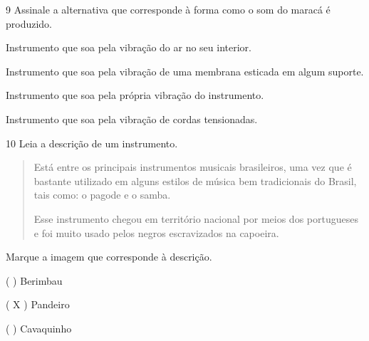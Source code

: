 
\num{9}  Assinale a alternativa que corresponde à forma como o som do maracá é produzido.

\begin{boxlist}
 Instrumento que soa pela vibração do ar no seu interior.

 Instrumento que soa pela vibração de uma membrana esticada em algum suporte.

 Instrumento que soa pela própria vibração do instrumento.

 Instrumento que soa pela vibração de cordas tensionadas.
\end{boxlist}


\num{10} Leia a descrição de um instrumento.

\begin{quote}
Está entre os principais instrumentos musicais brasileiros, uma vez que
é bastante utilizado em alguns estilos de música bem tradicionais do
Brasil, tais como: o pagode e o samba.

Esse instrumento chegou em território nacional por meios dos portugueses
e foi muito usado pelos negros escravizados na capoeira.

\end{quote}

Marque a imagem que corresponde à descrição.

( )
Berimbau


( X )
Pandeiro

( )
Cavaquinho


